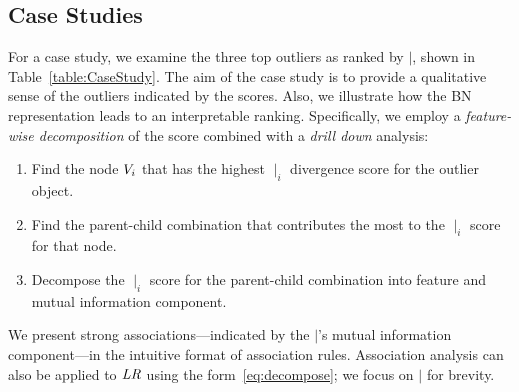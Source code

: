{							
							
							
							
							
							
							\subsection{Case Studies} \label{sec:CaseStudy} For a case study, we examine the three top outliers as ranked by $\mid$, shown in Table~\ref{table:CaseStudy}. 
							The aim of the case study is to provide a qualitative sense of the outliers indicated by the scores. Also, we illustrate how the BN representation leads to an interpretable ranking. 
							Specifically, we employ a {\em feature-wise decomposition} of the score combined with a {\em drill down} analysis: 
							
							\begin{enumerate}
								\item Find the node $V_{i}$ that has the highest $\mid_{i}$ divergence score for the outlier object. 
								\item Find the parent-child combination that contributes the most to the $\mid_{i}$ score for that node.
								\item Decompose the $\mid_{i}$ score for the parent-child combination into feature and mutual information component. 
							\end{enumerate}
							
							We present strong associations---indicated by the $\mid$'s mutual information component---in the intuitive format of association rules. Association analysis can also be applied to $\it{LR}$ using the form~\eqref{eq:decompose}; we focus on $\mid$ for brevity.
							
}
